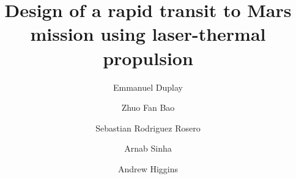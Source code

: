 \documentclass[final,3p,times,twocolumn,sort&compress, lefttitle]{elsarticle}
\begin{document}
\begin{frontmatter}



\title{Design of a rapid transit to Mars mission using laser-thermal propulsion}

%
%

\author{Emmanuel Duplay}
\author{Zhuo Fan Bao}
\author{Sebastian Rodriguez Rosero}
\author{Arnab Sinha}
\author{Andrew Higgins}


\address{Department of Mechanical Engineering, McGill University, Montreal, Quebec, H3A 0C3, Canada}



\end{frontmatter}
\end{document}
